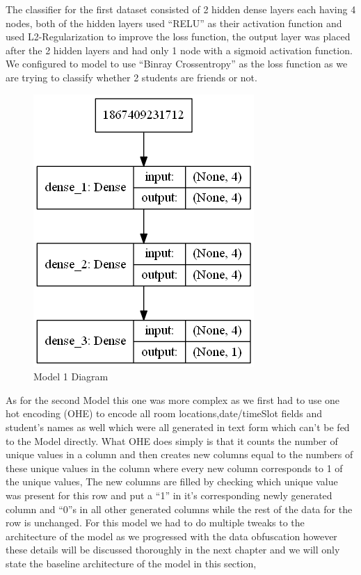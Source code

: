 The classifier for the first dataset consisted of 2 hidden dense layers each having 4 nodes, both of the hidden layers used “RELU” as their activation function and used L2-Regularization to improve the loss function, the output layer was placed after the 2 hidden layers and had only 1 node with a sigmoid activation function. We configured to model to use “Binray Crossentropy” as the loss function as
we are trying to classify whether 2 students are friends or not.
\begin{figure}[H]
  \centering
  \includegraphics[scale=0.65]{model}
  \caption{Model 1 Diagram}
  \label{fig:Model1}
\end{figure}
As for the second Model this one was more complex as we first had to use one hot encoding (OHE) to encode all room locations,date/timeSlot fields and student's names as well which were all generated in text form which can't be fed to the Model directly.
What OHE does simply is that it counts the number of unique values in a column and then creates new columns equal to the numbers of these unique values in the column where every new column corresponds to 1 of the unique values, The new columns are filled by checking which unique value was present for this row and put a “1” in it's corresponding newly generated column and “0”s in all other generated columns while the rest of the data for the row is unchanged.
For this model we had to do multiple tweaks to the architecture of the model as we progressed with the data obfuscation however these details will be discussed thoroughly in the next chapter and we will only state the baseline architecture of the model in this section,
